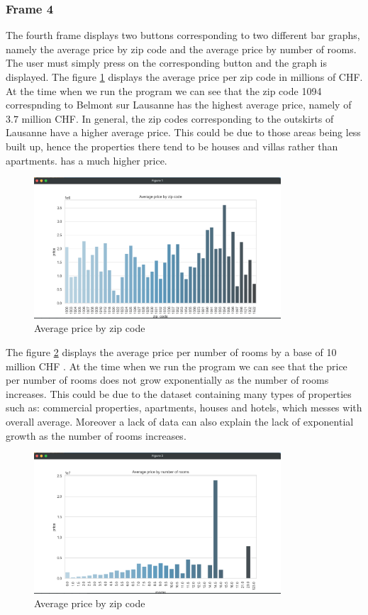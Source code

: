 \documentclass[main]{subfiles}
\begin{document}
\subsubsection{Frame 4}
The fourth frame displays two buttons corresponding to two different bar graphs, 
namely the average price by zip code and the average price by number of rooms.
The user must simply press on the corresponding button and the graph is displayed. 
The figure \ref{fig:pricebyzip} displays the average price per zip code in millions of CHF. 
At the time when we run the program we can see that the zip code 1094 correspnding to Belmont sur Lausanne has the highest average price, namely of $3.7$ million CHF.
In general, the zip codes corresponding to the outskirts of Lausanne have a higher average price. 
This could be due to those areas being less built up, hence the properties there tend to be houses and villas rather than apartments. 
has a much higher price. 

\begin{figure}[htbp]
    \centerline{
        \includegraphics[width = 92mm]{prog_11.png}}
    \caption{Average price by zip code}
    \label{fig:pricebyzip}
\end{figure}


The figure \ref{fig:pricebyrooms} displays the average price per number of rooms by a base of 10 million CHF . 
At the time when we run the program we can see that the price per number of rooms does not grow exponentially as the number of rooms increases.
This could be due to the dataset containing many types of properties such as: commercial properties, apartments, houses and hotels, which messes with overall average. 
Moreover a lack of data can also explain the lack of exponential growth as the number of rooms increases. 

\begin{figure}[htbp]
    \centerline{
        \includegraphics[width = 92mm]{prog_12.png}}
    \caption{Average price by zip code}
    \label{fig:pricebyrooms}
\end{figure}
\end{document}
